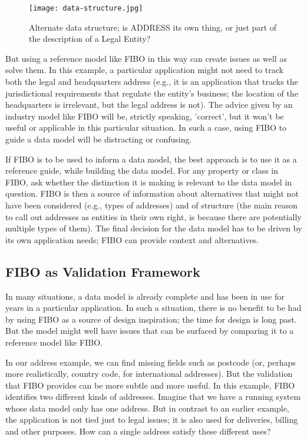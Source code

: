 \begin{figure}[hbt] %
\centering
  \texttt{[image: data-structure.jpg]}
\caption{Alternate data structure; is ADDRESS its own thing, or just part of the description of a Legal Entity? }
\label{ch01.fig1} 
\end{figure}


But using a reference model like FIBO in this way can create issues as well as solve them.  In this example, a particular application might not need to track both the legal and headquarters address (e.g., it is an application that tracks the jurisdictional requirements that regulate the entity's business; the location of the headquarters is irrelevant, but the legal address is not).   The advice given by an industry model like FIBO will be, strictly speaking, 'correct', but it won't be useful or applicable in this particular situation.  In such a case, using FIBO to guide a data model will be distracting or confusing. 

If FIBO is to be used to inform a data model, the best approach is to use it as a reference guide, while building the data model.  For any property or class in FIBO, ask whether the distinction it is making is relevant to the data model in question.  FIBO is then a source of information about alternatives that might not have been considered (e.g., types of addresses) and of structure (the main reason to call out addresses as entities in their own right, is because there are potentially multiple types of them).  The final decision for the data model has to be driven by its own application needs; FIBO can provide context and alternatives. 

\subsection{FIBO as Validation Framework}

In many situations, a data model is already complete and has been in use for years in a particular application.  In such a situation, there is no benefit to be had by using FIBO as a source of design inspiration; the time for design is long past.  But the model might well have issues that can be surfaced by comparing it to a reference model like FIBO. 

In our address example, we can find missing fields such as postcode (or, perhaps more realistically, country code, for international addresses).  But the validation that FIBO provides can be more subtle and more useful.  In this example, FIBO identifies two different kinds of addresses.  Imagine that we have a running system whose data model only has one address.  But in contrast to an earlier example, the application is not tied just to legal issues; it is also used for deliveries, billing and other purposes.  How can a single address satisfy these different uses? 

